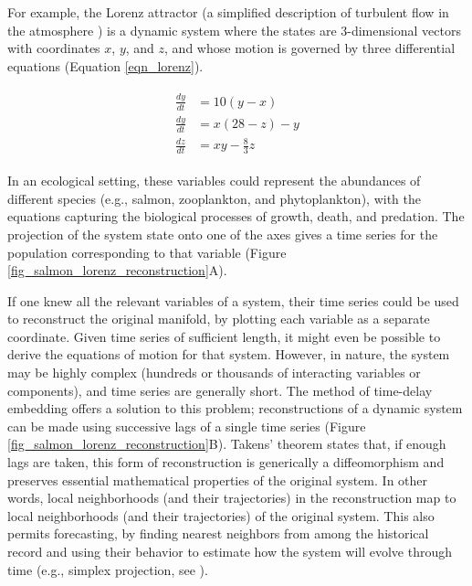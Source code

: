 For example, the Lorenz attractor (a simplified description of turbulent flow in the atmosphere \cite{Lorenz_1963}) is a dynamic system where the states are 3-dimensional vectors with coordinates $x$, $y$, and $z$, and whose motion is governed by three differential equations (Equation \ref{eqn_lorenz}).

\begin{align}
\label{eqn_lorenz}
\begin{split}
\frac{dy}{dt} &= 10(y-x)\\
\frac{dy}{dt} &= x(28-z)-y\\
\frac{dz}{dt} &= xy - \frac{8}{3}z
\end{split}
\end{align}

In an ecological setting, these variables could represent the abundances of different species (e.g., salmon, zooplankton, and phytoplankton), with the equations capturing the biological processes of growth, death, and predation. The projection of the system state onto one of the axes gives a time series for the population corresponding to that variable (Figure \ref{fig_salmon_lorenz_reconstruction}A).

If one knew all the relevant variables of a system, their time series could be used to reconstruct the original manifold, by plotting each variable as a separate coordinate. Given time series of sufficient length, it might even be possible to derive the equations of motion for that system. However, in nature, the system may be highly complex (hundreds or thousands of interacting variables or components), and time series are generally short. The method of time-delay embedding \cite{Takens_1981, Crutchfield_1987} offers a solution to this problem; reconstructions of a dynamic system can be made using successive lags of a single time series (Figure \ref{fig_salmon_lorenz_reconstruction}B). Takens' theorem \cite{Takens_1981} states that, if enough lags are taken, this form of reconstruction is generically a diffeomorphism and preserves essential mathematical properties of the original system. In other words, local neighborhoods (and their trajectories) in the reconstruction map to local neighborhoods (and their trajectories) of the original system. This also permits forecasting, by finding nearest neighbors from among the historical record and using their behavior to estimate how the system will evolve through time (e.g., simplex projection, see ).

